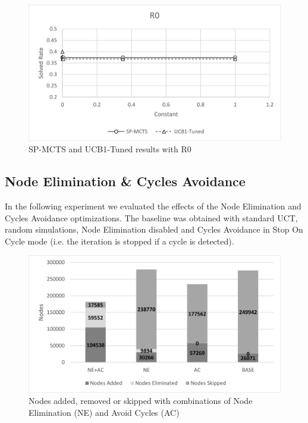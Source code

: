 \begin{figure}[!h]
    \centering
    \includegraphics[width=0.8\linewidth]{pictures/Sokoban-SP-R0.png}
    \caption{SP-MCTS and UCB1-Tuned results with R0}
    \label{fig:spmcts_R0}
\end{figure}

\subsection{Node Elimination \& Cycles Avoidance}
In the following experiment we evaluated the effects of the Node Elimination and Cycles Avoidance optimizations. The baseline was obtained with standard UCT, random simulations, Node Elimination disabled and Cycles Avoidance in Stop On Cycle mode (i.e. the iteration is stopped if a cycle is detected).
\begin{figure}[!h]
    \centering
    \includegraphics[width=0.9\linewidth]{pictures/SokobanNEACNodes.png}
    \caption[Node Elimination evaluation]{Nodes added, removed or skipped with combinations of Node Elimination (NE) and Avoid Cycles (AC)}
    \label{fig:SokobanNodeEliminationNodes}
\end{figure}

